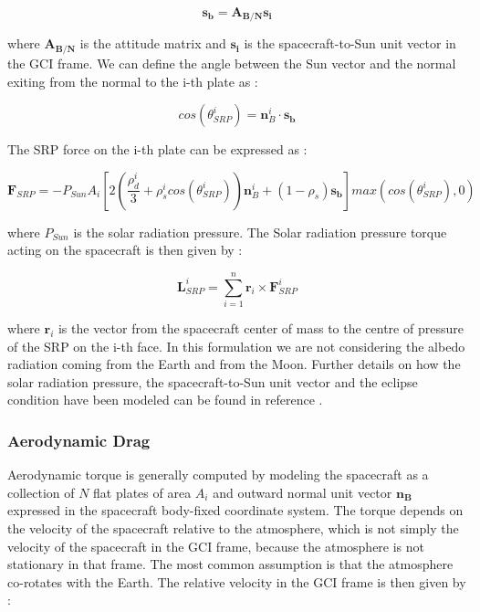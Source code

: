 \begin{equation}
 \mathbf{s_b} = \mathbf{A_{B/N}} \mathbf{s_i}
\end{equation}

where $\mathbf{A_{B/N}}$ is the attitude matrix and $\mathbf{s_i}$ is the spacecraft-to-Sun unit vector in the GCI frame.
We can define the angle between the Sun vector and the normal exiting from the normal to the i-th plate as : 

\begin{equation}
 cos(\theta_{SRP}^{i}) = \mathbf{n}_{B}^{i} \cdot \mathbf{s_b}
\end{equation}

The SRP force on the i-th plate can be expressed as : 

\begin{equation}
 \mathbf{F}_{SRP} = - P_{Sun}A_{i}\left[ 2\left( \frac{\rho_{d}^{i}}{3} + \rho_{s}^{i}cos(\theta_{SRP}^{i}) \right) \mathbf{n}_{B}^{i} + (1 -\rho_{s}) \mathbf{s_b} \right] max(cos(\theta_{SRP}^{i}),0)
\end{equation}

where $P_{Sun}$ is the solar radiation pressure.
The Solar radiation pressure torque acting on the spacecraft is then given by :

\begin{equation}
    \mathbf{L}_{SRP}^{i} = \sum\limits_{i=1}^n  \mathbf{r}_{i} \times \mathbf{F}_{SRP}^{i} 
\end{equation}

where $\mathbf{r}_{i}$ is the vector from the spacecraft center of mass to the centre of pressure of the SRP on the i-th face.
In this formulation we are not considering the albedo radiation coming from the Earth and from the Moon.
Further details on how the solar radiation pressure, the spacecraft-to-Sun unit vector and the eclipse condition have been modeled can be found in reference \cite{Markley2014}.

\subsubsection{Aerodynamic Drag}
Aerodynamic torque is generally computed by modeling the spacecraft as a collection of $N$ flat plates of area $A_i$ and outward normal unit vector $\mathbf{n_{B}}$ expressed in the spacecraft body-fixed coordinate system. The torque depends on the velocity of the spacecraft relative to the atmosphere, which is not simply the velocity of the spacecraft in the GCI frame, because the atmosphere is not stationary in that frame.
The most common assumption is that the atmosphere co-rotates with the Earth. The relative velocity in the GCI frame is then given by : 

